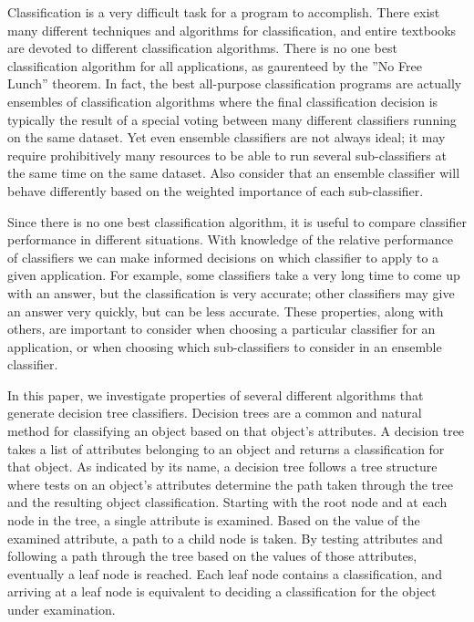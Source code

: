 \documentclass[12pt, letterpaper]{article}
\begin{document}
Classification is a very difficult task for a program to accomplish.  There exist
many different techniques and algorithms for classification, and entire textbooks
are devoted to different classification algorithms\cite{ML_Mitchell}.  There is no
one best classification algorithm for all applications, as gaurenteed by the 
''No Free Lunch'' theorem\cite{noFreeLunch}.  In fact, the best all-purpose classification
programs are actually ensembles of classification algorithms where the final
classification decision is typically the result of a special voting between
many different classifiers running on the same dataset\cite{Opitz_Ensemble}.
Yet even ensemble classifiers are not always ideal; it may require prohibitively many resources
to be able to run several sub-classifiers at the same time on the same dataset. Also consider
that an ensemble classifier will behave differently based on the 
weighted importance of each sub-classifier\cite{Dynamic_Classifier}. 

Since there is no one best classification algorithm\cite{noFreeLunch}, it is useful to compare
classifier performance in different situations.  With knowledge of the relative
performance of classifiers we can make informed decisions on which classifier to 
apply to a given application.  For example, some classifiers take a very long time 
to come up with an answer, but the classification is very accurate; other classifiers may give
an answer very quickly, but can be less accurate.  These properties, along with others, are
important to consider when choosing a particular classifier for an application, or 
when choosing which sub-classifiers to consider in an ensemble classifier\cite{Dynamic_Classifier}.

In this paper, we investigate properties of several different algorithms that generate
decision tree classifiers.  Decision trees are a common and natural method for classifying an object
based on that object's attributes\cite{Russell}.  A decision tree takes a list of 
attributes belonging to an object and returns a classification for that object\cite{Russell}. 
As indicated by its name, a decision tree follows a tree structure where tests on an object's attributes
determine the path taken through the tree and the resulting object classification.
Starting with the root node and at each node in the tree, a single attribute is examined.  
Based on the value of the examined attribute,
a path to a child node is taken.  By testing attributes and following a path
through the tree based on the values of those attributes, eventually a leaf
node is reached.  Each leaf node contains a classification, and arriving at a
leaf node is equivalent to deciding a classification for the object under
examination.
\end{document}
